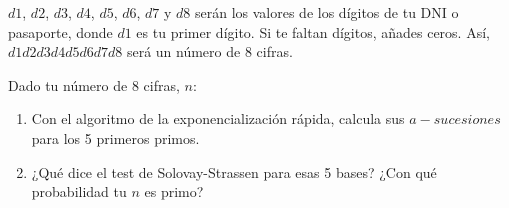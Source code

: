 $d1$, $d2$, $d3$, $d4$, $d5$, $d6$, $d7$ y $d8$ serán los valores de los dígitos de tu DNI o pasaporte, donde $d1$
es tu primer dígito. Si te faltan dígitos, añades ceros. Así, $d1d2d3d4d5d6d7d8$ será un número de 8 cifras.

Dado tu número de 8 cifras, $n$:
\begin{enumerate}
	\item Con el algoritmo de la exponencialización rápida, calcula sus $a-sucesiones$ para los 5 primeros primos.
	\item ¿Qué dice el test de Solovay-Strassen para esas 5 bases? ¿Con qué probabilidad tu $n$ es primo?
\end{enumerate}
